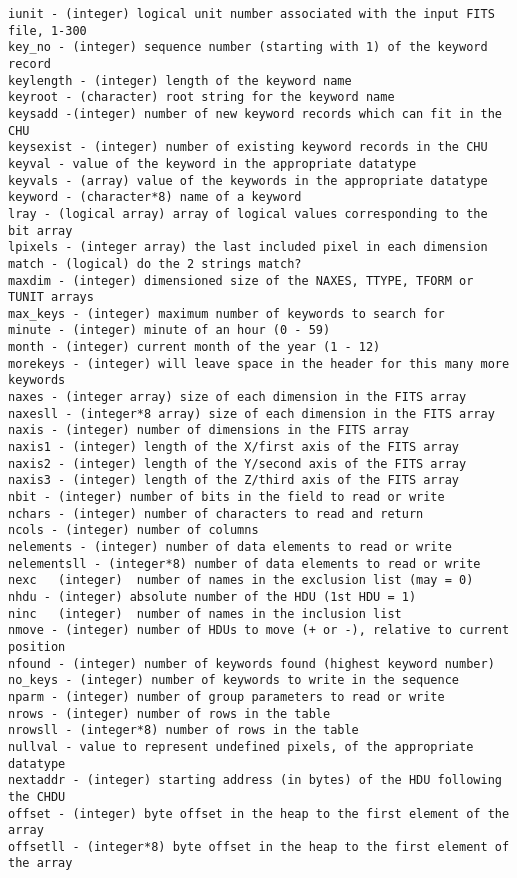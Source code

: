 \documentclass[11pt]{book}
\begin{document}
\begin{verbatim}
iunit - (integer) logical unit number associated with the input FITS file, 1-300
key_no - (integer) sequence number (starting with 1) of the keyword record
keylength - (integer) length of the keyword name
keyroot - (character) root string for the keyword name
keysadd -(integer) number of new keyword records which can fit in the CHU
keysexist - (integer) number of existing keyword records in the CHU
keyval - value of the keyword in the appropriate datatype
keyvals - (array) value of the keywords in the appropriate datatype
keyword - (character*8) name of a keyword
lray - (logical array) array of logical values corresponding to the bit array
lpixels - (integer array) the last included pixel in each dimension
match - (logical) do the 2 strings match?
maxdim - (integer) dimensioned size of the NAXES, TTYPE, TFORM or TUNIT arrays
max_keys - (integer) maximum number of keywords to search for
minute - (integer) minute of an hour (0 - 59)
month - (integer) current month of the year (1 - 12)
morekeys - (integer) will leave space in the header for this many more keywords
naxes - (integer array) size of each dimension in the FITS array
naxesll - (integer*8 array) size of each dimension in the FITS array
naxis - (integer) number of dimensions in the FITS array
naxis1 - (integer) length of the X/first axis of the FITS array
naxis2 - (integer) length of the Y/second axis of the FITS array
naxis3 - (integer) length of the Z/third axis of the FITS array
nbit - (integer) number of bits in the field to read or write
nchars - (integer) number of characters to read and return
ncols - (integer) number of columns
nelements - (integer) number of data elements to read or write
nelementsll - (integer*8) number of data elements to read or write
nexc   (integer)  number of names in the exclusion list (may = 0)
nhdu - (integer) absolute number of the HDU (1st HDU = 1)
ninc   (integer)  number of names in the inclusion list
nmove - (integer) number of HDUs to move (+ or -), relative to current position
nfound - (integer) number of keywords found (highest keyword number)
no_keys - (integer) number of keywords to write in the sequence
nparm - (integer) number of group parameters to read or write
nrows - (integer) number of rows in the table
nrowsll - (integer*8) number of rows in the table
nullval - value to represent undefined pixels, of the appropriate datatype
nextaddr - (integer) starting address (in bytes) of the HDU following the CHDU
offset - (integer) byte offset in the heap to the first element of the array
offsetll - (integer*8) byte offset in the heap to the first element of the array

\end{verbatim}
\end{document}
